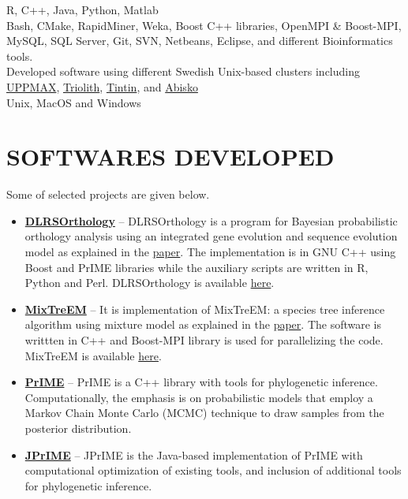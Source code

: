 \documentclass[margin, 10pt]{res} %
\begin{document}
\begin{resume}
{\bf \color{Brown}{Languages:}} 
R, C++, Java, Python, Matlab \\
{\bf \color{Brown}{Misc Tools:}} Bash, CMake, RapidMiner, Weka, Boost C++ libraries, OpenMPI \& Boost-MPI, MySQL, SQL Server, Git, SVN, Netbeans, Eclipse, and different Bioinformatics tools. \\
{\bf \color{Brown}{HPC Clusters:}} Developed software using different Swedish Unix-based clusters including \href{http://www.uppmax.uu.se/}{UPPMAX}, \href{https://www.nsc.liu.se/systems/triolith/}{Triolith}, \href{http://www.uppmax.uu.se/}{Tintin}, and \href{http://www.hpc2n.umu.se/resources/abisko}{Abisko} \\
{\bf \color{Brown}{Operating Systems:}} Unix, MacOS and Windows 


\section{SOFTWARES DEVELOPED} 
Some of selected projects are given below.
\begin{itemize}
\item \textbf{\href{http://prime.scilifelab.se/dlrsorthology/}{DLRSOrthology}} -- DLRSOrthology is a program for Bayesian probabilistic orthology analysis using an integrated gene evolution and sequence evolution model as explained in the \href{https://doi.org/10.1093/sysbio/syv044}{paper}. The implementation is in GNU C++ using Boost and PrIME libraries while the auxiliary scripts are written in R, Python and Perl. DLRSOrthology is available \href{https://bitbucket.org/ikramu/dlrsorthology}{here}.
\item \textbf{\href{http://prime.scilifelab.se/mixtreem/}{MixTreEM}} -- It is implementation of MixTreEM: a species tree inference algorithm using mixture model as explained in the \href{https://doi.org/10.1093/molbev/msv115}{paper}. The software is writtten in C++ and Boost-MPI library is used for parallelizing the code. MixTreEM is available \href{https://bitbucket.org/ikramu/mixtreem}{here}.
\item \textbf{\href{http://prime.scilifelab.se/}{PrIME}} -- PrIME is a C++ library with tools for phylogenetic inference. Computationally, the emphasis is on probabilistic models that employ a Markov Chain Monte Carlo (MCMC) technique to draw samples from the posterior distribution.
\item \textbf{\href{https://code.google.com/p/jprime/}{JPrIME}} -- JPrIME is the Java-based implementation of PrIME with computational optimization of existing tools, and inclusion of additional tools for phylogenetic inference.
\end{itemize}


\end{resume}
\end{document}
